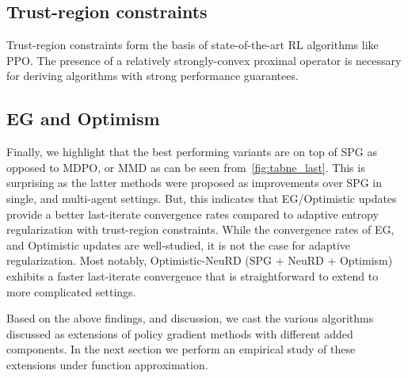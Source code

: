 \subsection{Trust-region constraints}
Trust-region constraints form the basis of state-of-the-art RL algorithms like PPO.
The presence of a relatively strongly-convex proximal operator is necessary for deriving algorithms
with strong performance guarantees.

\subsection{EG and Optimism}
Finally, we highlight that the best performing variants are on top of SPG as opposed to MDPO, or
MMD as can be seen from~\ref{fig:tabne_last}.
This is surprising as the latter methods were proposed as improvements over SPG in single, and
multi-agent settings.
But, this indicates that EG/Optimistic updates provide a better last-iterate convergence rates
compared to adaptive entropy regularization with trust-region constraints.
While the convergence rates of EG, and Optimistic updates are well-studied, it is not the case for
adaptive regularization.
Most notably, Optimistic-NeuRD (SPG + NeuRD + Optimism) exhibits a faster last-iterate convergence
that is straightforward to extend to more complicated settings.

Based on the above findings, and discussion, we cast the various algorithms discussed as extensions
of policy gradient methods with different added components.
In the next section we perform an empirical study of these extensions under function approximation.
